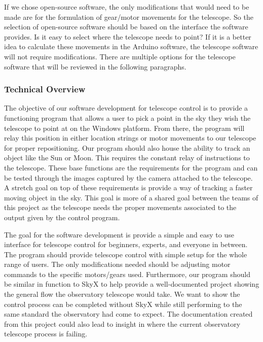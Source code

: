 \documentclass[12pt]{report}
\begin{document}
If we chose open-source software, the only modifications that would need to be made are for the formulation of gear/motor movements for the telescope. So the selection of open-source software should be based on the interface the software provides. Is it easy to select where the telescope needs to point? If it is a better idea to calculate these movements in the Arduino software, the telescope software will not require modifications. There are multiple options for the telescope software that will be reviewed in the following paragraphs.

\subsubsection*{Technical Overview}

The objective of our software development for telescope control is to provide a functioning program that allows a user to pick a point in the sky they wish the telescope to point at on the Windows platform. From there, the program will relay this position in either location strings or motor movements to our telescope for proper repositioning. Our program should also house the ability to track an object like the Sun or Moon. This requires the constant relay of instructions to the telescope. These base functions are the requirements for the program and can be tested through the images captured by the camera attached to the telescope. A stretch goal on top of these requirements is provide a way of tracking a faster moving object in the sky. This goal is more of a shared goal between the teams of this project as the telescope needs the proper movements associated to the output given by the control program.

The goal for the software development is provide a simple and easy to use interface for telescope control for beginners, experts, and everyone in between. The program should provide telescope control with simple setup for the whole range of users. The only modifications needed should be adjusting motor commands to the specific motors/gears used. Furthermore, our program should be similar in function to SkyX to help provide a well-documented project showing the general flow the observatory telescope would take. We want to show the control process can be completed without SkyX while still performing to the same standard the observatory had come to expect. The documentation created from this project could also lead to insight in where the current observatory telescope process is failing.
\end{document}
